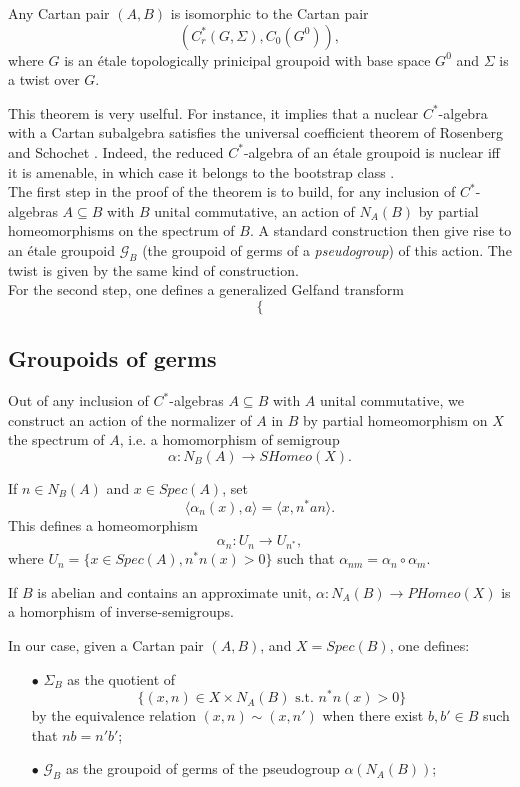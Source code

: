 \begin{thm}
Any Cartan pair $(A,B)$ is isomorphic to the Cartan pair 
\[(C^*_r(G,\Sigma), C_0(G^0)),\] 
where $G$ is an \'etale topologically prinicipal groupoid with base space $G^0$ and $\Sigma$ is a twist over $G$.
\end{thm}

This theorem is very uselful. For instance, it implies that a nuclear $C^*$-algebra with a Cartan subalgebra satisfies the universal coefficient theorem of Rosenberg and Schochet \cite{RosenbergUCT}. Indeed, the reduced $C^*$-algebra of an \'etale groupoid is nuclear iff it is amenable, in which case it belongs to the bootstrap class \cite{TuThese}.\\ 

The first step in the proof of the theorem is to build, for any inclusion of $C^*$-algebras $A\subseteq B$ with $B$ unital commutative, an action of $N_{A}(B)$ by partial homeomorphisms on the spectrum of $B$. A standard construction then give rise to an \'etale groupoid $\mathcal G_B$ (the groupoid of germs of a \textit{pseudogroup}) of this action. The twist is given by the same kind of construction.\\

For the second step, one defines a generalized Gelfand transform 
\[ \left\{ \right.\]

\subsection{Groupoids of germs}

Out of any inclusion of $C^*$-algebras $A\subseteq B$ with $A$ unital commutative, we construct an action of the normalizer of $A$ in $B$ by partial homeomorphism on $X$ the spectrum of $A$, i.e. a homomorphism of semigroup  
\[\alpha: N_B(A) \rightarrow SHomeo(X).\] 

If $n\in N_B(A)$ and $x\in Spec(A)$, set 
\[\langle \alpha_n(x) , a\rangle =\langle x , n^*a n\rangle .\]
This defines a homeomorphism 
\[\alpha_n : U_n \rightarrow U_{n^*},\]
where $U_n = \{x\in Spec(A), n^*n(x) >0\}$ such that $\alpha_{nm} =\alpha_{n} \circ \alpha_{m}$.

\begin{lem} If $B$ is abelian and contains an approximate unit, $\alpha: N_A(B) \rightarrow PHomeo(X) $ is a homorphism of inverse-semigroups.
\end{lem}

In our case, given a Cartan pair $(A,B)$, and $X = Spec(B)$, one defines:
\begin{itemize} 
\item[$\bullet$] $\Sigma_{B}$ as the quotient of 
\[ \{(x, n)\in X\times N_A(B) \text{ s.t. } n^*n(x)>0 \}  \]
by the equivalence relation $(x,n) \sim (x,n')$ when there exist $b,b'\in B$ such that $nb = n'b'$;  
\item[$\bullet$] $\mathcal G_B$ as the groupoid of germs of the pseudogroup $\alpha(N_A(B))$;
\end{itemize}

